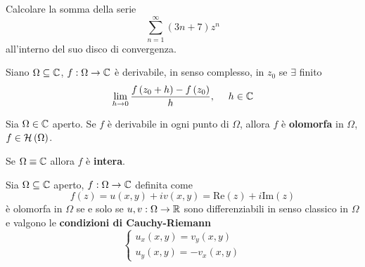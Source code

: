 Calcolare la somma della serie
\begin{equation*}
\sum\limits ^{\infty }_{n=1}\left( 3n+7\right) z^{n}
\end{equation*}
all'interno del suo disco di convergenza.
\ParteSoluzioni
\Soluzione
\begin{defn}
Siano $\Omega \subseteq \mathbb{C} $, $f:\Omega \rightarrow \mathbb{C} $ è derivabile, in senso complesso, in $z_{0}$ se $\exists $ finito
\begin{equation*}
\lim\limits _{h\rightarrow 0}\frac{f\left( z_{0} +h\right) -f\left( z_{0}\right)}{h} ,\ \ \ \ h\in \mathbb{C} 
\end{equation*}
\end{defn}
\begin{defn}
Sia $\Omega \in \mathbb{C} $ aperto. Se $f$ è derivabile in ogni punto di $\Omega $, allora $f$ è \textbf{olomorfa} in $\Omega $, $f\in \mathcal{H} \left( \Omega \right)$.
\end{defn}
\begin{rem}
Se $\Omega \equiv \mathbb{C} $ allora $f$ è \textbf{intera}.
\end{rem}
\begin{thm}
 Sia $\Omega \subseteq \mathbb{C} $ aperto, $f:\Omega \rightarrow \mathbb{C} $ definita come
\begin{equation*}
f\left( z\right) =u\left( x,y\right) +iv\left( x,y\right) =\mathrm{Re}\left( z\right) +i\mathrm{Im}\left( z\right)
\end{equation*}
è olomorfa in $\Omega $ se e solo se $u,v:\Omega \rightarrow \mathbb{R} $ sono differenziabili in senso classico in $\Omega $ e valgono le \textbf{condizioni di Cauchy-Riemann}
\begin{equation}
\begin{cases}
u_{x}\left( x,y\right) =v_{y}\left( x,y\right)\\
u_{y}\left( x,y\right) =-v_{x}\left( x,y\right)
\end{cases}
\end{equation}
\end{thm}
